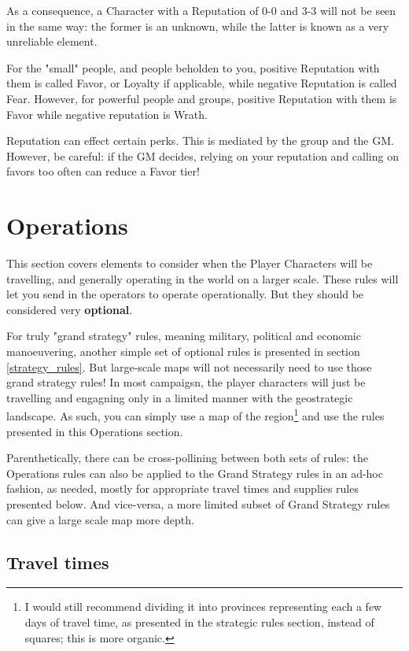 As a consequence, a Character with a Reputation of 0-0 and 3-3 will not be seen in the same way: the former is an unknown, while the latter is known as a very unreliable element.

For the "small" people, and people beholden to you, positive Reputation with them is called Favor, or Loyalty if applicable, while negative Reputation is called Fear. However, for powerful people and groups, positive Reputation with them is Favor while negative reputation is Wrath.

Reputation can effect certain perks. This is mediated by the group and the GM. However, be careful: if the GM decides, relying on your reputation and calling on favors too often can reduce a Favor tier!



\section{Operations}
\label{operations}

This section covers elements to consider when the Player Characters will be travelling, and generally operating in the world on a larger scale. These rules will let you send in the operators to operate operationally. But they should be considered very \textbf{optional}.

For truly "grand strategy" rules, meaning military, political and economic manoeuvering, another simple set of optional rules is presented in section \ref{strategy_rules}. But large-scale maps will not necessarily need to use those grand strategy rules! In most campaigsn, the player characters will just be travelling and engagning only in a limited manner with the geostrategic landscape. As such, you can simply use a map of the region\footnote{I would still recommend dividing it into provinces representing each a few days of travel time, as presented in the strategic rules section, instead of squares; this is more organic.} and use the rules presented in this Operations section.

Parenthetically, there can be cross-pollining between both sets of rules: the Operations rules can also be applied to the Grand Strategy rules in an ad-hoc fashion, as needed, mostly for appropriate travel times and supplies rules presented below. And vice-versa, a more limited subset of Grand Strategy rules can give a large scale map more depth.


\subsection{Travel times}



